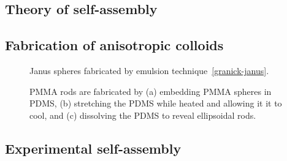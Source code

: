 \subsection{Theory of self-assembly}
\begin{figure}
\label{fig:glotzer-sim-assembly}
\end{figure}

\subsection{Fabrication of anisotropic colloids}

\begin{figure}
\caption{Janus spheres fabricated by emulsion technique~\ref{granick-janus}.}
\label{fig:granick-janus-spheres}
\end{figure}

\begin{figure}
\caption{PMMA rods are fabricated by (a) embedding PMMA spheres in PDMS, (b) stretching the PDMS while heated and allowing it 
it to cool, and (c) dissolving the PDMS to reveal ellipsoidal rods.}
\label{fig:solomon-rods}
\end{figure}

\begin{figure}
\label{fig:branched-particles}
\end{figure}

\begin{figure}
\label{fig:faceted-particles}
\end{figure}

\begin{figure}
\label{fig:PRINT}
\end{figure}

\begin{itemize}
\end{itemize}


\begin{itemize}
\end{itemize}

\subsection{Experimental self-assembly}
\begin{itemize}
\end{itemize}


